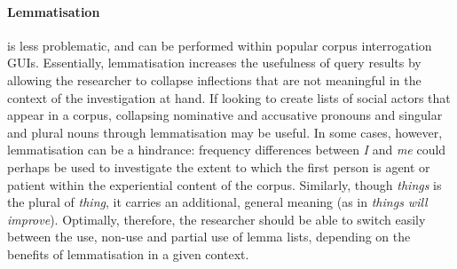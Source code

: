 
 \paragraph{Lemmatisation} is less problematic, and can be performed within popular corpus interrogation GUIs. Essentially, lemmatisation increases the usefulness of query results by allowing the researcher to collapse inflections that are not meaningful in the context of the investigation at hand. If looking to create lists of social actors that appear in a corpus, collapsing nominative and accusative pronouns and singular and plural nouns through lemmatisation may be useful. In some cases, however, lemmatisation can be a hindrance: frequency differences between \emph{I} and \emph{me} could perhaps be used to investigate the extent to which the first person is agent or patient within the experiential content of the corpus. Similarly, though \emph{things} is the plural of \emph{thing}, it carries an additional, general meaning (as in \emph{things will improve}). Optimally, therefore, the researcher should be able to switch easily between the use, non-use and partial use of lemma lists, depending on the benefits of lemmatisation in a given context.


